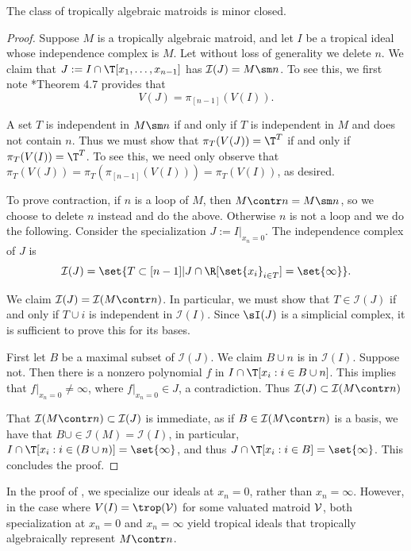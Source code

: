 \begin{proposition}\label{prop:algMinorClosed}
The class of tropically algebraic matroids is minor closed.
\end{proposition}
\begin{proof}
Suppose $M$ is a tropically algebraic matroid, and let $I$ be a tropical ideal whose independence complex is $M$. Let without loss of generality we delete $n$. We claim that $J:=I\cap \T[x_1,\dots,x_{n-1}]$ has $\mathcal I(J) = M\sm n$. To see this, we first note \cite{MR20}*{Theorem 4.7} provides that
$$V(J)= \pi_{[n-1]}(V(I)).$$

A set $T$ is independent in $M\sm n$ if and only if $T$ is independent in $M$ and does not contain $n$. Thus we must show that $\pi_T(V(J))=\T^T$ if and only if $\pi_T(V(I))=\T^T$. To see this, we need only observe that $\pi_T(V(J))=\pi_T(\pi_{[n-1]}(V(I)))=\pi_T(V(I))$, as desired.

To prove contraction, if $n$ is a loop of $M$, then $M\contr n =M\sm n$, so we choose to delete $n$ instead and do the above. Otherwise $n$ is not a loop and we do the following. Consider the specialization $J:= I|_{x_n=0}$. The independence complex of $J$ is 
$$\mathcal I(J) = \set{T\subset [n-1] | J \cap \R[\set{x_i}_{i\in T}] = \set{\infty}}.$$

We claim $\mathcal I(J) = \mathcal I(M\contr n)$. In particular, we must show that $T\in \mathcal I(J)$ if and only if $T\cup i$ is independent in $\mathcal I(I)$. Since $\sI(J)$ is a simplicial complex, it is sufficient to prove this for its bases.


First let $B$ be a maximal subset of $\mathcal I(J)$. We claim $B\cup n$ is in $\mathcal I(I)$. Suppose not. Then there is a nonzero polynomial $f$ in $I\cap \T[x_i: i \in B\cup n]$. This implies that $f|_{x_n=0}\neq \infty$, where $f|_{x_n=0}\in J$, a contradiction. Thus $\mathcal I(J)\subset \mathcal I(M\contr n)$

That $\mathcal I(M\contr n)\subset \mathcal I(J)$ is immediate, as if $B\in \mathcal I(M\contr n)$ is a basis, we have that $B\cup \in \mathcal I(M)=\mathcal I(I)$, in particular, $I\cap \T[x_i: i\in (B\cup n)]=\set{\infty}$, and thus $J\cap \T[x_i: i\in B]=\set{\infty}$. This concludes the proof.
\end{proof}

In the proof of , we specialize our ideals at $x_n=0$, rather than $x_n=\infty$. However, in the case where $V(I)=\trop(\sV)$ for some valuated matroid $\mathcal{V}$, both specialization at $x_n=0$ and $x_n=\infty$ yield tropical ideals that tropically algebraically represent $M\contr n$.





